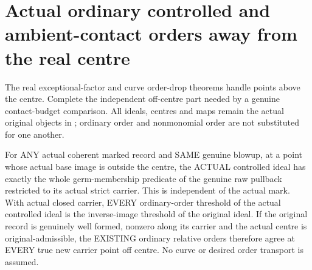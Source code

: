 \section{Actual ordinary controlled and ambient-contact orders away from the real centre}

The real exceptional-factor and curve order-drop theorems handle points
above the centre. Complete the independent off-centre part needed by a
genuine contact-budget comparison. All ideals, centres and maps remain
the actual original objects in \cite[\S12]{bierstone-milman97-invent-math};
ordinary order and nonmonomial order are not substituted for one another.

\begin{theorem}
\label{hir:sharp-actual-controlled-ordinary-order-off-centre}
\leanok
For ANY actual coherent marked record and SAME genuine blowup, at a point
whose actual base image is outside the centre, the ACTUAL controlled
ideal has exactly the whole germ-membership predicate of the genuine raw
pullback restricted to its actual strict carrier. This is independent
of the actual mark. With actual closed carrier, EVERY ordinary-order
threshold of the actual controlled ideal is the inverse-image threshold
of the original ideal. If the original record is genuinely well formed,
nonzero along its carrier and the actual centre is original-admissible,
the EXISTING ordinary relative orders therefore agree at EVERY true new
carrier point off centre. No curve or desired order transport is assumed.
\end{theorem}
